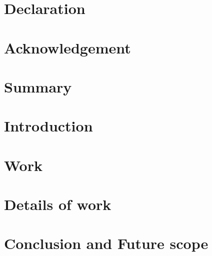 \documentclass[12pt]{report}
\begin{document}


\setlength{\parindent}{0pt}


\chapter*{Declaration}


\chapter*{Acknowledgement}



\tableofcontents
\listoffigures

\clearpage
{}

\chapter{Summary}

\chapter{Introduction}

\chapter{Work}

\chapter{Details of work}

\chapter{Conclusion and Future scope}

\begin{thebibliography}{9}
    
\end{thebibliography}
\end{document}
